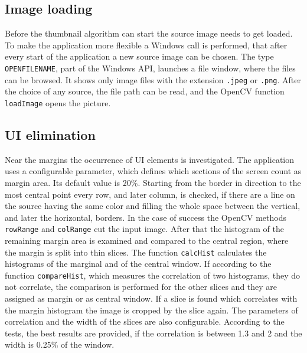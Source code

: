 \documentclass[draft,final]{vutinfth} %
\begin{document}
	\subsection{Image loading}
	Before the thumbnail algorithm can start the source image needs to get loaded.
	To make the application more flexible a Windows call is performed, that after every start of the application a new source image can be chosen.
	The type \texttt{OPENFILENAME}, part of the Windows API, launches a file window, where the files can be browsed.
	It shows only image files with the extension \texttt{.jpeg} or \texttt{.png}.
	After the choice of any source, the file path can be read, and the OpenCV function \texttt{loadImage} opens the picture.
	
	\subsection{UI elimination}
	Near the margins the occurrence of UI elements is investigated.
	The application uses a configurable parameter, which defines which sections of the screen count as margin area. 
	Its default value is 20\%. 
	Starting from the border in direction to the most central point every row, and later column, is checked, if there are a line on the source having the same color and filling the whole space between the vertical, and later the horizontal, borders.
	In the case of success the OpenCV methods \texttt{rowRange} and \texttt{colRange} cut the input image.
	After that the histogram of the remaining margin area is examined and compared to the central region, where the margin is split into thin slices.
	The function \texttt{calcHist} calculates the histograms of the marginal and of the central window.
	If according to the function \texttt{compareHist}, which measures the correlation of two histograms,%
	they do not correlate, the comparison is performed for the other slices and they are assigned as margin or as central window.
	If a slice is found which correlates with the margin histogram the image is cropped by the slice again. 
	The parameters of correlation and the width of the slices are also configurable.
	According to the tests, the best results are provided, if the correlation is between 1.3 and 2 and the width is 0.25\% of the window.
	
\end{document}

